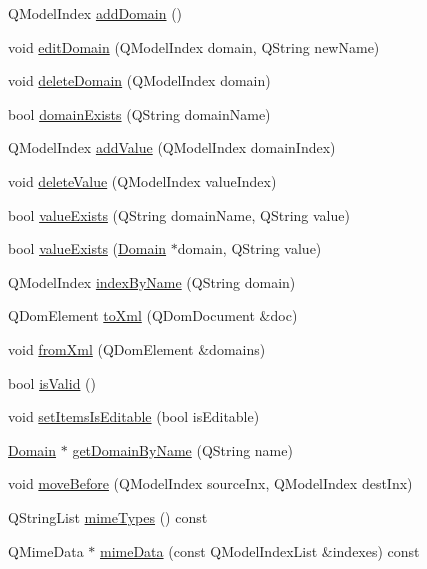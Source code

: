 \begin{DoxyCompactItemize}
\item 
QModelIndex \hyperlink{class_domain_model_a75b45483c795dddd91568e7844e9ee83}{addDomain} ()
\item 
void \hyperlink{class_domain_model_ae1f04fa1cc292b5534075f3e301664aa}{editDomain} (QModelIndex domain, QString newName)
\item 
void \hyperlink{class_domain_model_aa592b6841ac4a946f9e65c622b324efd}{deleteDomain} (QModelIndex domain)
\item 
bool \hyperlink{class_domain_model_a96b1a8f93cfb4ced4dc280eab3940f27}{domainExists} (QString domainName)
\item 
QModelIndex \hyperlink{class_domain_model_ab4547cf7ef7f375671d9ca37b6c0720b}{addValue} (QModelIndex domainIndex)
\item 
void \hyperlink{class_domain_model_af1433c75de73ddb81e556793d11f9e1d}{deleteValue} (QModelIndex valueIndex)
\item 
bool \hyperlink{class_domain_model_a84cd3e480bce10f08ebc0d41826a98d9}{valueExists} (QString domainName, QString value)
\item 
bool \hyperlink{class_domain_model_a3b68019a9add9363920012c15fa8e5b9}{valueExists} (\hyperlink{class_domain}{Domain} $\ast$domain, QString value)
\item 
QModelIndex \hyperlink{class_domain_model_ab6e0399356a6c9046b91fe37bdb90a9f}{indexByName} (QString domain)
\item 
QDomElement \hyperlink{class_domain_model_a31a98493ea55e4cc430b6623c3ebfcdf}{toXml} (QDomDocument \&doc)
\item 
void \hyperlink{class_domain_model_a1d23cde23fc08a0c7ad095c3fda6ac7d}{fromXml} (QDomElement \&domains)
\item 
bool \hyperlink{class_domain_model_a941c1e4edffffb3e4441bde9aa91a560}{isValid} ()
\item 
void \hyperlink{class_domain_model_a77a06ec53eaf555cef2741cee969b591}{setItemsIsEditable} (bool isEditable)
\item 
\hyperlink{class_domain}{Domain} $\ast$ \hyperlink{class_domain_model_a4cab7c29dea9786533f6378328999d88}{getDomainByName} (QString name)
\item 
void \hyperlink{class_domain_model_af152b5c038dc4ac3c564e0238e4eb62d}{moveBefore} (QModelIndex sourceInx, QModelIndex destInx)
\item 
QStringList \hyperlink{class_domain_model_ab9218e6d390c8617efb7b7b507fa1631}{mimeTypes} () const 
\item 
QMimeData $\ast$ \hyperlink{class_domain_model_a9686294f858aa9bf0cd2b09657867d42}{mimeData} (const QModelIndexList \&indexes) const 

\end{DoxyCompactItemize}
